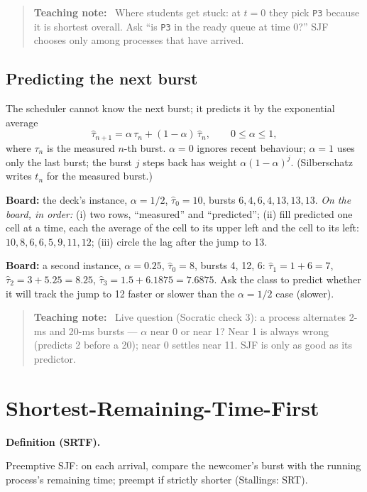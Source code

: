 \documentclass[11pt]{article}
\newenvironment{definitionbox}[1]{%
  \par\noindent\textbf{Definition (#1).}\ \itshape
}{\par\vspace{0.3em}}
\newenvironment{teachingaside}{\begin{quote}\small\color{primary-gold}\textbf{Teaching note:}\ }{\end{quote}}
\begin{document}
\begin{teachingaside}
Where students get stuck: at $t=0$ they pick \texttt{P3} because it is shortest overall. Ask ``is \texttt{P3} in the ready queue at time 0?'' SJF chooses only among processes that have arrived.
\end{teachingaside}

\subsection*{Predicting the next burst}

The scheduler cannot know the next burst; it predicts it by the exponential average
\[
  \hat{\tau}_{n+1} = \alpha\,\tau_n + (1-\alpha)\,\hat{\tau}_n, \qquad 0 \le \alpha \le 1,
\]
where $\tau_n$ is the measured $n$-th burst. $\alpha = 0$ ignores recent behaviour; $\alpha = 1$ uses only the last burst; the burst $j$ steps back has weight $\alpha(1-\alpha)^j$. (Silberschatz writes $t_n$ for the measured burst.)

\textbf{Board:} the deck's instance, $\alpha = 1/2$, $\hat{\tau}_0 = 10$, bursts $6, 4, 6, 4, 13, 13, 13$. \emph{On the board, in order:} (i) two rows, ``measured'' and ``predicted''; (ii) fill predicted one cell at a time, each the average of the cell to its upper left and the cell to its left: $10, 8, 6, 6, 5, 9, 11, 12$; (iii) circle the lag after the jump to 13.

\textbf{Board:} a second instance, $\alpha = 0.25$, $\hat{\tau}_0 = 8$, bursts 4, 12, 6: $\hat{\tau}_1 = 1 + 6 = 7$, $\hat{\tau}_2 = 3 + 5.25 = 8.25$, $\hat{\tau}_3 = 1.5 + 6.1875 = 7.6875$. Ask the class to predict whether it will track the jump to 12 faster or slower than the $\alpha = 1/2$ case (slower).

\begin{teachingaside}
Live question (Socratic check 3): a process alternates 2-ms and 20-ms bursts --- $\alpha$ near 0 or near 1? Near 1 is always wrong (predicts 2 before a 20); near 0 settles near 11. SJF is only as good as its predictor.
\end{teachingaside}

\section{Shortest-Remaining-Time-First}

\begin{definitionbox}{SRTF}
Preemptive SJF: on each arrival, compare the newcomer's burst with the running process's remaining time; preempt if strictly shorter (Stallings: SRT).
\end{definitionbox}
\end{document}
